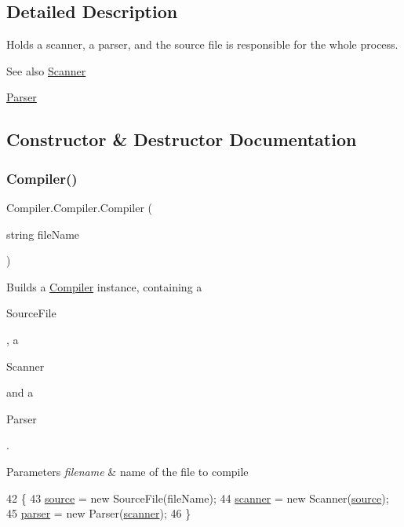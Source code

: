 \subsection{Detailed Description}
Holds a scanner, a parser, and the source file is responsible for the whole process. \begin{DoxySeeAlso}{See also}
\mbox{\hyperlink{class_compiler_1_1_scanner}{Scanner}} 

\mbox{\hyperlink{class_compiler_1_1_parser}{Parser}} 
\end{DoxySeeAlso}


\subsection{Constructor \& Destructor Documentation}
\mbox{\label{class_compiler_1_1_compiler_ab9ae50ccd497464301c3bd9acf5d1d89}} 
\subsubsection{\texorpdfstring{Compiler()}{Compiler()}}
{\footnotesize\ttfamily Compiler.\+Compiler.\+Compiler (\begin{DoxyParamCaption}\item[{string}]{file\+Name }\end{DoxyParamCaption})}

Builds a \mbox{\hyperlink{class_compiler_1_1_compiler}{Compiler}} instance, containing a
\begin{DoxyCode}
SourceFile 
\end{DoxyCode}
 , a
\begin{DoxyCode}
Scanner 
\end{DoxyCode}
 and a
\begin{DoxyCode}
Parser 
\end{DoxyCode}
 . 
\begin{DoxyParams}{Parameters}
{\em filename} & name of the file to compile \\
\hline
\end{DoxyParams}

\begin{DoxyCode}
42                                                  \{
43                     \mbox{\hyperlink{class_compiler_1_1_compiler_a6096cba7dada5002eb07a626dc76cb89}{source}} = \textcolor{keyword}{new} SourceFile(fileName);
44                     \mbox{\hyperlink{class_compiler_1_1_compiler_a8ec56dd708f82bf4b16a074f7263e8f1}{scanner}} = \textcolor{keyword}{new} Scanner(\mbox{\hyperlink{class_compiler_1_1_compiler_a6096cba7dada5002eb07a626dc76cb89}{source}});
45                     \mbox{\hyperlink{class_compiler_1_1_compiler_a73660c59052687e1b4b92b7549dcd171}{parser}} = \textcolor{keyword}{new} Parser(\mbox{\hyperlink{class_compiler_1_1_compiler_a8ec56dd708f82bf4b16a074f7263e8f1}{scanner}});
46                 \}
\end{DoxyCode}


